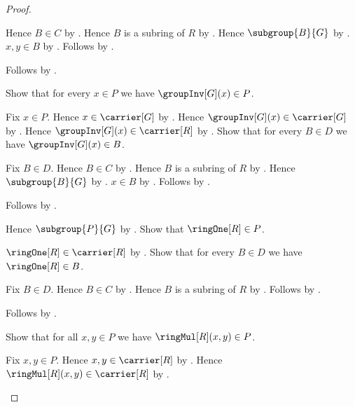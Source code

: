 \begin{proof}
\begin{subproof}
\begin{subproof}
\begin{subproof}
                Hence $B\in C$ by .
                Hence $B$ is a subring of $R$ by \auto.
                Hence $\subgroup{B}{G}$ by
                    .
                $x,y\in B$ by .
                Follows by .
            \end{subproof}
            Follows by .
        \end{subproof}
        Show that for every $x\in P$ we have $\groupInv[G](x)\in P$.
        \begin{subproof}
            Fix $x\in P$.
            Hence $x\in\carrier[G]$ by .
            Hence $\groupInv[G](x)\in\carrier[G]$ by
                .
            Hence $\groupInv[G](x)\in\carrier[R]$ by
                .
            Show that for every $B\in D$ we have $\groupInv[G](x)\in B$.
            \begin{subproof}
                Fix $B\in D$.
                Hence $B\in C$ by .
                Hence $B$ is a subring of $R$ by \auto.
                Hence $\subgroup{B}{G}$ by
                    .
                $x\in B$ by .
                Follows by .
            \end{subproof}
            Follows by .
        \end{subproof}
        Hence $\subgroup{P}{G}$ by .
        Show that $\ringOne[R]\in P$.
        \begin{subproof}
            $\ringOne[R]\in\carrier[R]$ by .
            Show that for every $B\in D$ we have $\ringOne[R]\in B$.
            \begin{subproof}
                Fix $B\in D$.
                Hence $B\in C$ by .
                Hence $B$ is a subring of $R$ by \auto.
                Follows by .
            \end{subproof}
            Follows by .
        \end{subproof}
        Show that for all $x,y\in P$ we have $\ringMul[R](x,y)\in P$.
        \begin{subproof}
            Fix $x,y\in P$.
            Hence $x,y\in\carrier[R]$ by .
            Hence $\ringMul[R](x,y)\in\carrier[R]$ by
                .

\end{subproof}
\end{subproof}
\end{proof}

